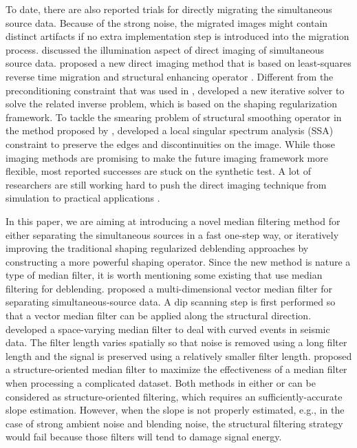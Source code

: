 To date, there are also  reported trials for directly migrating the simultaneous source data. Because of the strong  noise, the migrated images might contain distinct artifacts if no extra implementation step is introduced into the migration process.  \cite{berkhout2012} discussed the illumination aspect of direct imaging of simultaneous source data. \cite{zhiguang2016} proposed a new direct imaging method that is based on least-squares reverse time migration and structural enhancing operator \cite[]{liuyang2010}. Different from the preconditioning constraint that was used in \cite{daiwei2011}, \cite{zhiguang2016} developed a new iterative solver to solve the  related inverse problem, which is based on the shaping regularization framework. To tackle the smearing problem of structural smoothing operator in the  method proposed by \cite{zhiguang2016}, \cite{yangkang2017lsrtm} developed a local singular spectrum analysis (SSA) constraint to preserve the edges and discontinuities on the image. While those imaging methods are promising to make the future imaging framework more flexible, most reported successes are stuck on the synthetic test. A lot of researchers are still working hard to push the direct imaging technique from simulation to practical applications \cite[]{dutta2017lsrtm,lichuang2018}. 

In this paper, we are aiming at introducing a novel median filtering method for either separating the simultaneous sources in a fast one-step way, or iteratively improving the traditional shaping regularized deblending approaches by constructing a more powerful shaping operator. Since the new method is  nature a type of median filter, it is worth mentioning some existing  that use median filtering for deblending. \cite{mediandeblend} proposed a multi-dimensional vector median filter for separating simultaneous-source data. A dip scanning step is first performed so that a vector median filter can be applied along the structural direction. \cite{yangkang2015svmf} developed a space-varying median filter to deal with curved events in seismic data. The filter length varies spatially so that noise is removed using a long filter length and the signal is preserved using a relatively smaller filter length. \cite{shuwei2016} proposed a structure-oriented median filter to maximize the effectiveness of a median filter when processing a complicated dataset. Both methods in either \cite{mediandeblend} or \cite{shuwei2016} can be considered as structure-oriented filtering, which requires an sufficiently-accurate slope estimation. However, when the slope is not properly estimated, e.g., in the case of strong ambient noise and blending noise, the structural filtering strategy would fail because those filters will tend to damage signal energy. 

